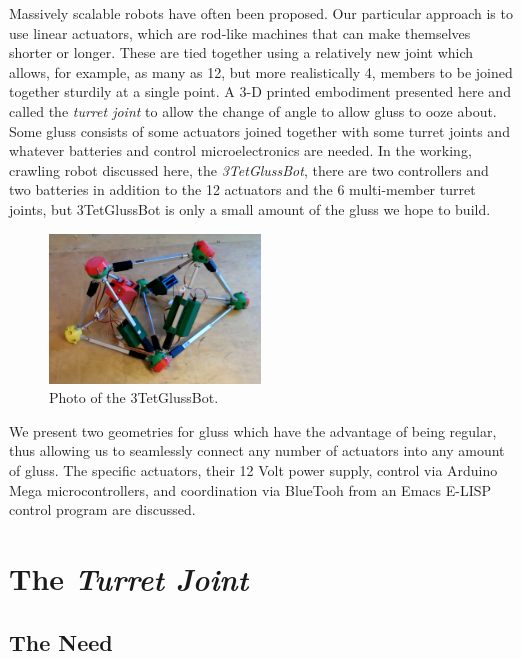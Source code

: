 \documentclass[12pt]{article}
\begin{document}
Massively scalable robots have often been proposed. Our particular approach is to use linear actuators,
which are rod-like machines that can make themselves shorter or longer. These are tied together using
a relatively new joint \cite{song2003spherical} which allows, for example, as many as 12, but more realistically 4,
members to be joined together sturdily at a single point.
A 3-D printed embodiment presented here and called the \emph{turret joint} to allow the
change of angle to allow gluss to ooze about. Some gluss consists of some actuators joined together
with some turret joints and whatever batteries and control microelectronics are needed. In the
working, crawling robot discussed here, the \emph{3TetGlussBot}, there are two controllers and two batteries
in addition to the 12 actuators and the 6 multi-member turret joints, but 3TetGlussBot is only
a small amount of the gluss we hope to build.

\begin{figure}[!ht]
  \centering
    \includegraphics[width=0.5\textwidth]{3TetGlussBotPhoto.png}
    \caption[3TetGlussBot Photo]{Photo of the 3TetGlussBot.}
      \label{3TetGlussBotPhoto}
\end{figure}


We present two geometries for gluss which have the advantage of being regular, thus allowing us to
seamlessly connect any number of actuators into any amount of gluss.
The specific actuators, their 12 Volt power supply, control via Arduino Mega microcontrollers, and
coordination via BlueTooh from an Emacs E-LISP control program are discussed.

\section{The \textit{Turret Joint}}

\subsection{The Need}
\end{document}
